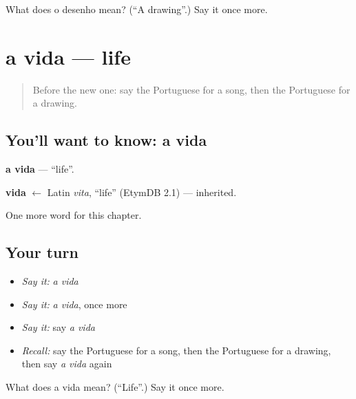 \begin{tcolorbox}[breakable,colback=teal!4,colframe=teal!35!black,title={Before you move on}]
What does o desenho mean? (\textquotedblleft{}A drawing\textquotedblright{}.) Say it once more.
\end{tcolorbox}
\section[a vida]{a vida — life}

\label{lesson:PT-C115-vida}



\begin{quote}
Before the new one: say the Portuguese for a song, then the Portuguese for a drawing.
\end{quote}

\subsection*{You'll want to know: a vida}
\textbf{a vida} — \textquotedblleft{}life\textquotedblright{}.

\begin{cousinweb}
\textbf{vida} $\leftarrow$ Latin \emph{vita}, \textquotedblleft{}life\textquotedblright{} (EtymDB 2.1) — inherited.
\end{cousinweb}

\begin{grammarlens}[title={What you've built}]
One more word for this chapter.
\end{grammarlens}

\subsection*{Your turn}
\begin{itemize}
\raggedright
  \item \emph{Say it:} \emph{a vida}
  \item \emph{Say it:} \emph{a vida}, once more
  \item \emph{Say it:} say \emph{a vida}
  \item \emph{Recall:} say the Portuguese for a song, then the Portuguese for a drawing, then say \emph{a vida} again
\end{itemize}

\begin{tcolorbox}[breakable,colback=teal!4,colframe=teal!35!black,title={Before you move on}]
What does a vida mean? (\textquotedblleft{}Life\textquotedblright{}.) Say it once more.
\end{tcolorbox}
